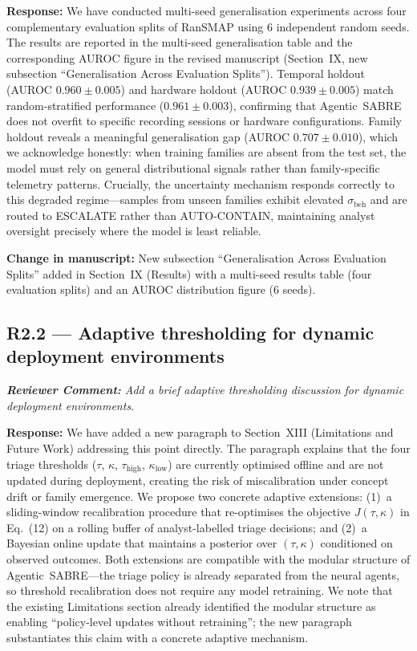 \documentclass[11pt,a4paper]{article}
\newcommand{\RC}[1]{\begin{reviewbox}\textit{\textbf{Reviewer Comment:} #1}\end{reviewbox}}
\newcommand{\RS}[1]{\noindent\textcolor{responsegreen}{\textbf{Response:}} #1\par\medskip}
\newcommand{\CH}[1]{\noindent\textcolor{changebrown}{\textbf{Change in manuscript:}} #1\par\bigskip}
\begin{document}
\RS{We have conducted multi-seed generalisation experiments across four complementary
evaluation splits of RanSMAP using 6 independent random seeds. The results are reported
in the multi-seed generalisation table and the corresponding AUROC figure in the
revised manuscript (Section~IX, new subsection ``Generalisation Across Evaluation
Splits''). Temporal holdout (AUROC $0.960 \pm 0.005$) and hardware holdout
(AUROC $0.939 \pm 0.005$) match random-stratified performance ($0.961 \pm 0.003$),
confirming that Agentic~SABRE does not overfit to specific recording sessions or
hardware configurations. Family holdout reveals a meaningful generalisation gap
(AUROC $0.707 \pm 0.010$), which we acknowledge honestly: when training families are
absent from the test set, the model must rely on general distributional signals rather
than family-specific telemetry patterns. Crucially, the uncertainty mechanism responds
correctly to this degraded regime---samples from unseen families exhibit elevated
$\sigma_{\mathrm{beh}}$ and are routed to \textsc{ESCALATE} rather than
\textsc{AUTO-CONTAIN}, maintaining analyst oversight precisely where the model is
least reliable.}

\CH{New subsection ``Generalisation Across Evaluation Splits'' added in Section~IX
(Results) with a multi-seed results table (four evaluation splits) and an AUROC
distribution figure (6 seeds).}

\subsection*{R2.2 --- Adaptive thresholding for dynamic deployment environments}

\RC{Add a brief adaptive thresholding discussion for dynamic deployment environments.}

\RS{We have added a new paragraph to Section~XIII (Limitations and Future Work)
addressing this point directly. The paragraph explains that the four triage
thresholds ($\tau$, $\kappa$, $\tau_{\text{high}}$, $\kappa_{\text{low}}$) are
currently optimised offline and are not updated during deployment, creating the risk
of miscalibration under concept drift or family emergence. We propose two concrete
adaptive extensions: (1)~a sliding-window recalibration procedure that
re-optimises the objective $J(\tau,\kappa)$ in Eq.~(12) on a rolling buffer of
analyst-labelled triage decisions; and (2)~a Bayesian online update that maintains
a posterior over $(\tau,\kappa)$ conditioned on observed outcomes. Both extensions
are compatible with the modular structure of Agentic~SABRE---the triage policy is
already separated from the neural agents, so threshold recalibration does not require
any model retraining. We note that the existing Limitations section already
identified the modular structure as enabling ``policy-level updates without
retraining''; the new paragraph substantiates this claim with a concrete adaptive
mechanism.}
\end{document}

